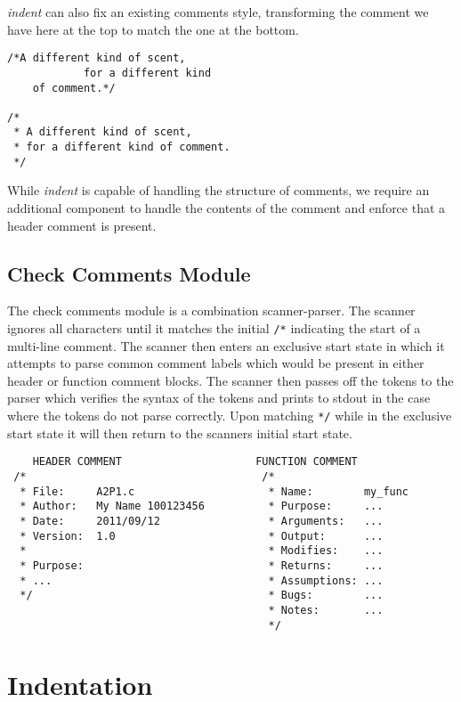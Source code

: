 \noindent \emph{indent} can also fix an existing comments style, transforming 
the comment we have here at the top to match the one at the bottom. 
\begin{verbatim}
/*A different kind of scent,
            for a different kind
    of comment.*/
 
/*
 * A different kind of scent,
 * for a different kind of comment.
 */
\end{verbatim}
 
While \emph{indent} is capable of handling the structure of comments, we require an 
additional component to handle the contents of the comment and enforce that a 
header comment is present.
\newpage
\subsection{Check Comments Module}

The check comments module is a combination scanner-parser.
The scanner ignores all characters until it matches the initial \texttt{/*}
indicating the start of a multi-line comment. The scanner then enters an 
exclusive start state in which it attempts to parse common comment labels which
would be present in either header or function comment blocks. The scanner then
passes off the tokens to the parser which verifies the syntax of the tokens and
prints to stdout in the case where the tokens do not parse correctly. Upon 
matching \texttt{*/} while in the exclusive start state it will then return to
the scanners initial start state.

{\scriptsize{\begin{verbatim}
    HEADER COMMENT                     FUNCTION COMMENT
 /*                                     /*
  * File:     A2P1.c                     * Name:        my_func
  * Author:   My Name 100123456          * Purpose:     ...
  * Date:     2011/09/12                 * Arguments:   ...
  * Version:  1.0                        * Output:      ...
  *                                      * Modifies:    ...
  * Purpose:                             * Returns:     ...
  * ...                                  * Assumptions: ...
  */                                     * Bugs:        ...
                                         * Notes:       ...
                                         */
\end{verbatim}
}}

\section{Indentation}

